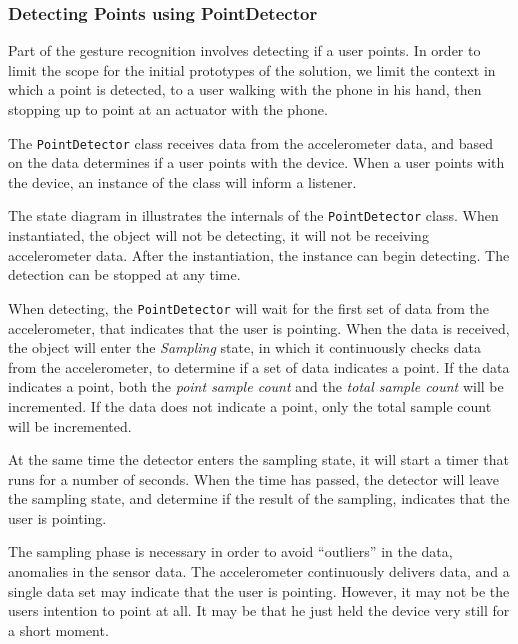 \subsubsection{Detecting Points using PointDetector}

Part of the gesture recognition involves detecting if a user points. 
In order to limit the scope for the initial prototypes of the solution, 
we limit the context in which a point is detected, 
to a user walking with the phone in his hand, 
then stopping up to point at an actuator with the phone.

The \texttt{PointDetector} class receives data from the accelerometer data, 
and based on the data determines if a user points with the device. 
When a user points with the device, 
an instance of the class will inform a listener.

The state diagram in  illustrates the internals of the \texttt{PointDetector} class. 
When instantiated, the object will not be detecting, 
\ie it will not be receiving accelerometer data. 
After the instantiation, the instance can begin detecting. 
The detection can be stopped at any time.

When detecting, the \texttt{PointDetector} will wait for the first set of data from the accelerometer, 
that indicates that the user is pointing. 
When the data is received, 
the object will enter the \textit{Sampling} state, 
in which it continuously checks data from the accelerometer, 
to determine if a set of data indicates a point. 
If the data indicates a point, 
both the \emph{point sample count} and the \emph{total sample count} will be incremented. 
If the data does not indicate a point, 
only the total sample count will be incremented.

At the same time the detector enters the sampling state, 
it will start a timer that runs for a number of seconds. 
When the time has passed, 
the detector will leave the sampling state, 
and determine if the result of the sampling, 
indicates that the user is pointing. 

The sampling phase is necessary in order to avoid ``outliers'' in the data, 
\ie anomalies in the sensor data. 
The accelerometer continuously delivers data, 
and a single data set may indicate that the user is pointing. 
However, it may not be the users intention to point at all. 
It may be that he just held the device very still for a short moment.

